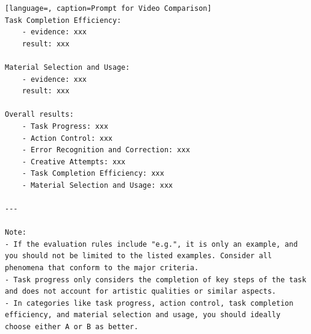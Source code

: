 \begin{lstlisting}[language=, caption=Prompt for Video Comparison]
Task Completion Efficiency:
    - evidence: xxx  
    result: xxx

Material Selection and Usage:
    - evidence: xxx  
    result: xxx

Overall results:
    - Task Progress: xxx  
    - Action Control: xxx  
    - Error Recognition and Correction: xxx  
    - Creative Attempts: xxx  
    - Task Completion Efficiency: xxx  
    - Material Selection and Usage: xxx

---

Note:
- If the evaluation rules include "e.g.", it is only an example, and you should not be limited to the listed examples. Consider all phenomena that conform to the major criteria.
- Task progress only considers the completion of key steps of the task and does not account for artistic qualities or similar aspects.
- In categories like task progress, action control, task completion efficiency, and material selection and usage, you should ideally choose either A or B as better.

\end{lstlisting}



